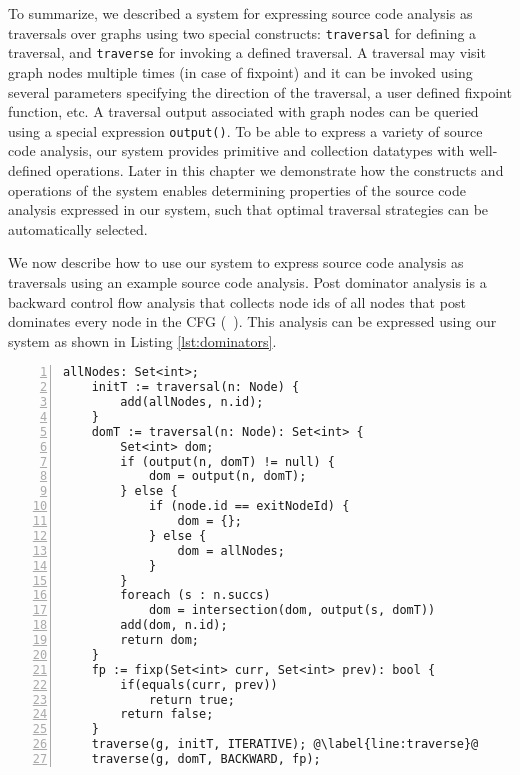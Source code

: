 To summarize, we described a system for expressing source code analysis as
traversals over graphs using two special constructs: \lstinline|traversal| for
defining a traversal, and \lstinline|traverse| for invoking a defined traversal. 
A traversal may visit graph nodes multiple times (in case of fixpoint) and it
can be invoked using several parameters specifying the direction of the
traversal, a user defined fixpoint function, etc.
A traversal output associated with graph nodes can be queried using a special
expression \lstinline|output()|. 
To be able to express a variety of source code analysis, our system provides
primitive and collection datatypes with well-defined operations.
Later in this chapter we demonstrate how the constructs and operations of the
system enables determining properties of the source code analysis expressed
in our system, such that optimal traversal strategies can be automatically
selected.

 We now describe how to use our system
to express source code analysis as traversals using an example source code analysis.
Post dominator analysis is a backward control flow analysis that collects node
ids of all nodes that post dominates every node in the CFG (~\cite{compilers}).
This analysis can be expressed using our system as shown in Listing
\ref{lst:dominators}.

\begin{lstlisting}[basicstyle=\footnotesize\ttfamily, numbers=left, numbersep=-8pt, 
escapechar=@, caption={Post dominator analysis: an example source code analysis
expressed using our system.}, label={lst:dominators}] 
	allNodes: Set<int>;
	initT := traversal(n: Node) { 
		add(allNodes, n.id);
	}
	domT := traversal(n: Node): Set<int> { 
		Set<int> dom;
		if (output(n, domT) != null) {
			dom = output(n, domT);
		} else {
			if (node.id == exitNodeId) {
				dom = {};
			} else {
				dom = allNodes;
			}
		}
		foreach (s : n.succs) 
			dom = intersection(dom, output(s, domT)) 
		add(dom, n.id); 
		return dom; 
	} 
	fp := fixp(Set<int> curr, Set<int> prev): bool {
		if(equals(curr, prev))
			return true;
		return false;
	}
	traverse(g, initT, ITERATIVE); @\label{line:traverse}@
	traverse(g, domT, BACKWARD, fp); 				
\end{lstlisting}

